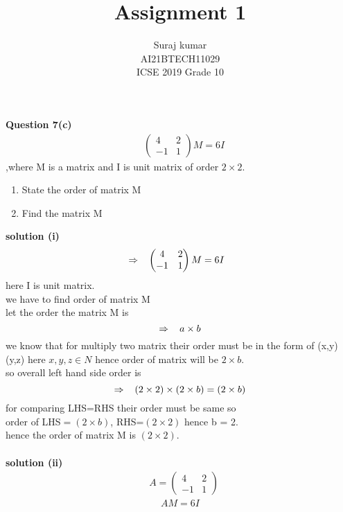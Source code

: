 \documentclass[journal,12pt,twocolumn]{IEEEtran}
\title{Assignment 1}
\author{Suraj kumar \\ \normalsize AI21BTECH11029\\\vspace*{20pt} \Large ICSE 2019 Grade 10}
\newcommand{\myvec}[1]{\ensuremath{\begin{pmatrix}#1\end{pmatrix}}}
\begin{document}
\maketitle

\textbf{Question 7(c)}\begin{align} &\myvec{4 & 2 \\-1 & 1 }M=6I\end{align}
 ,where M is a matrix and I is unit matrix of order $2\times 2.$
		\begin{enumerate}[label=(\roman*)]
		\item State the order of matrix M
		\item Find the matrix M
	\end{enumerate}	
	
 \textbf{solution (i) } 
 \begin{align}
	 &\Rightarrow  \hspace{3mm} \myvec{
     4 & 2 \\
     -1 & 1 
      }M=6I
 \end{align}
    here I is unit matrix.\\
    we have to find order of matrix M\\
    let the order the matrix M is  $$ \Rightarrow \hspace{3mm} a\times b$$
      we know that for multiply two matrix their order must be in the form of  (x,y) (y,z)  here $x,y,z \in N$
      hence order of matrix will be $2\times b$.\\
      so overall left hand side order is  $$\Rightarrow \hspace{3mm} (2\times 2)\times(2\times b) =(2\times b)$$
      for comparing LHS=RHS their order must be same so \\
      order of LHS$=(2\times b)$,
      RHS=$(2\times 2)$  hence b = 2.\\
      hence the order of matrix M is $(2\times 2).$\\\\
\textbf{solution (ii)}\\
  \begin{align}
 &A=\myvec{
      4 & 2\\
      -1 & 1
     }
\end{align}
 \begin{align}
 AM=6I
 \end{align}
 
\end{document}
